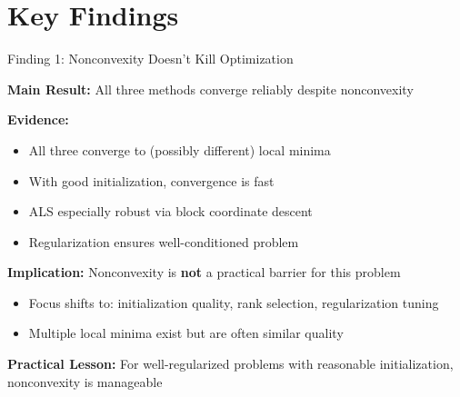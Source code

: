 \documentclass[aspectratio=169,usenames,dvipsnames]{beamer}
\begin{document}
\section{Key Findings}

\begin{frame}{Finding 1: Nonconvexity Doesn't Kill Optimization}
    
    \textbf{Main Result:} All three methods converge reliably despite nonconvexity
    
    \vspace{0.3cm}
    
    \textbf{Evidence:}
    \begin{itemize}
        \item All three converge to (possibly different) local minima
        \item With good initialization, convergence is fast
        \item ALS especially robust via block coordinate descent
        \item Regularization ensures well-conditioned problem
    \end{itemize}
    
    \vspace{0.3cm}
    
    \textbf{Implication:} Nonconvexity is \textbf{not} a practical barrier for this problem
    \begin{itemize}
        \item Focus shifts to: initialization quality, rank selection, regularization tuning
        \item Multiple local minima exist but are often similar quality
    \end{itemize}
    
    \vspace{0.3cm}
    
    \textbf{Practical Lesson:} For well-regularized problems with reasonable initialization,
    \\ nonconvexity is manageable
\end{frame}
\end{document}
